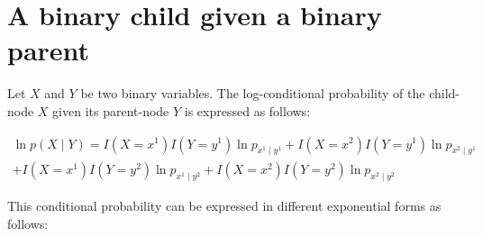 \documentclass[11pt, oneside]{article}   	%
\numberwithin{figure}{section}
\numberwithin{equation}{section}
\numberwithin{table}{section}
\begin{document}
\section{A binary child given a binary parent}

Let $X$ and $Y$ be two binary variables. The log-conditional probability of the child-node $X$ given its parent-node $Y$ is expressed as follows:

\begin{eqnarray*}
\ln p(X \mid Y) =  I(X= x^1) I(Y= y^1) \ln p_{x^1 \mid y^1} + I(X=x^2) I(Y= y^1) \ln p_{x^2 \mid y^1} \\
+ I(X=x^1) I(Y= y^2) \ln p_{x^1 \mid y^2} + I(X=x^2) I(Y= y^2) \ln p_{x^2 \mid y^2}
\end{eqnarray*}

This conditional probability can be expressed in different exponential forms as follows:
\end{document}
